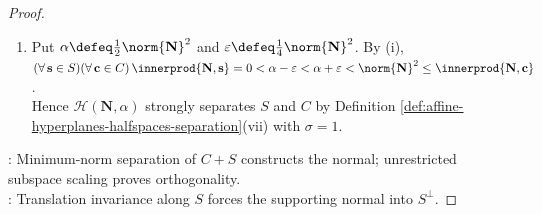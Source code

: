 \begin{theorem}
\begin{proof}
\begin{enumerate}[label=(\roman*)]
Fix $\mathbf{c}_0\in C$. For $\mathbf{s}\in S$, put $a\defeq\innerprod{\mathbf{N},\mathbf{s}}$. If $a\neq0$, set $\lambda\defeq\frac{\norm{\mathbf{N}}^2-\innerprod{\mathbf{N},\mathbf{c}_0}-1}{a}$.\\
Then $\lambda\mathbf{s}+\mathbf{c}_0\in D$ but $\innerprod{\mathbf{N},\lambda\mathbf{s}+\mathbf{c}_0}=\norm{\mathbf{N}}^2-1$, a contradiction.\\
Hence $(\forall\,\mathbf{s}\in S)\,\innerprod{\mathbf{N},\mathbf{s}}=0$, so $\mathbf{N}\in S^\perp$. Taking $\mathbf{s}=\mathbf{0}$ in the preceding bound proves $\innerprod{\mathbf{N},C}\geq\norm{\mathbf{N}}^2>0$.
\item Put $\alpha\defeq\frac{1}{2}\norm{\mathbf{N}}^2$ and $\varepsilon\defeq\frac{1}{4}\norm{\mathbf{N}}^2$. By (i), $(\forall\,\mathbf{s}\in S)(\forall\,\mathbf{c}\in C)\,\innerprod{\mathbf{N},\mathbf{s}}=0<\alpha-\varepsilon<\alpha+\varepsilon<\norm{\mathbf{N}}^2\leq\innerprod{\mathbf{N},\mathbf{c}}$.\\
Hence $\mathcal{H}(\mathbf{N},\alpha)$ strongly separates $S$ and $C$ by Definition \ref{def:affine-hyperplanes-halfspaces-separation}(vii) with $\sigma=1$.
\end{enumerate}
: Minimum-norm separation of $C+S$ constructs the normal; unrestricted subspace scaling proves orthogonality.\\
: Translation invariance along $S$ forces the supporting normal into $S^\perp$.
\end{proof}
\end{theorem}
